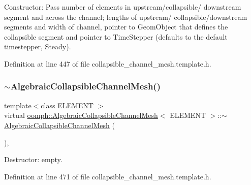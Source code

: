 Constructor\+: Pass number of elements in upstream/collapsible/ downstream segment and across the channel; lengths of upstream/ collapsible/downstream segments and width of channel, pointer to Geom\+Object that defines the collapsible segment and pointer to Time\+Stepper (defaults to the default timestepper, Steady). 



Definition at line 447 of file collapsible\+\_\+channel\+\_\+mesh.\+template.\+h.

\mbox{\label{classoomph_1_1AlgebraicCollapsibleChannelMesh_ab921ed3dbc5678fc5d39626fdf32c4ed}} 
\subsubsection{\texorpdfstring{$\sim$\+Algebraic\+Collapsible\+Channel\+Mesh()}{~AlgebraicCollapsibleChannelMesh()}}
{\footnotesize\ttfamily template$<$class E\+L\+E\+M\+E\+NT $>$ \\
virtual \hyperlink{classoomph_1_1AlgebraicCollapsibleChannelMesh}{oomph\+::\+Algebraic\+Collapsible\+Channel\+Mesh}$<$ E\+L\+E\+M\+E\+NT $>$\+::$\sim$\hyperlink{classoomph_1_1AlgebraicCollapsibleChannelMesh}{Algebraic\+Collapsible\+Channel\+Mesh} (\begin{DoxyParamCaption}{ }\end{DoxyParamCaption})\hspace{0.3cm}{\ttfamily [inline]}, {\ttfamily [virtual]}}



Destructor\+: empty. 



Definition at line 471 of file collapsible\+\_\+channel\+\_\+mesh.\+template.\+h.

\mbox{\label{classoomph_1_1AlgebraicCollapsibleChannelMesh_a3c19524e69a9408c79047d130b79d6b3}} 

